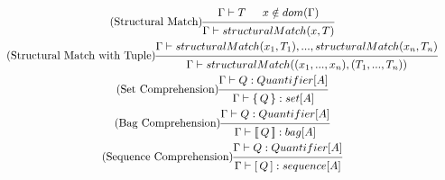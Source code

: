 \documentclass{article}
\newcommand{\setOne}[1]{%
  \{\, #1 \,\}%
}
\newcommand{\bagOne}[1]{%
  \llbracket \, #1 \, \rrbracket%
}
\newcommand{\listOne}[1]{%
  [\, #1 \, ]%
}
\begin{document}
\begin{gather}
\tag{Structural Match}
\begin{prooftree}
\hypo{\Gamma \vdash T}
\hypo{x \notin dom(\Gamma)}
\infer2{\Gamma \vdash structuralMatch(x, T)}
\end{prooftree}
\\
\tag{Structural Match with Tuple}
\begin{prooftree}
\hypo{\Gamma \vdash structuralMatch(x_1, T_1), ..., structuralMatch(x_n, T_n)}
\infer1{\Gamma \vdash structuralMatch((x_1, ..., x_n), (T_1, ..., T_n))}
\end{prooftree}
\\
\tag{Set Comprehension}
\begin{prooftree}
\hypo{\Gamma \vdash Q: Quantifier[A]}
\infer1{\Gamma \vdash \setOne{Q}: set[A]}
\end{prooftree}
\\
\tag{Bag Comprehension}
\begin{prooftree}
\hypo{\Gamma \vdash Q: Quantifier[A]}
\infer1{\Gamma \vdash \bagOne{Q}: bag[A]}
\end{prooftree}
\\
\tag{Sequence Comprehension}
\begin{prooftree}
\hypo{\Gamma \vdash Q: Quantifier[A]}
\infer1{\Gamma \vdash \listOne{Q}: sequence[A]}
\end{prooftree}

\end{gather}
\end{document}
